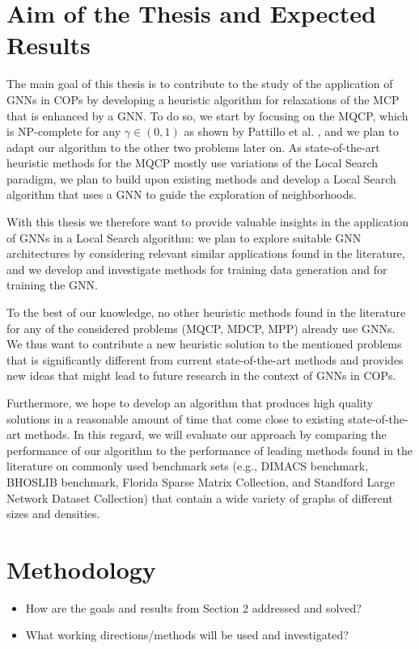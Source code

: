 \documentclass [11pt]{article}
\begin{document}
\section{Aim of the Thesis and Expected Results}
The main goal of this thesis is to contribute to the study of the application of GNNs in COPs by developing a heuristic algorithm for relaxations of the MCP that is enhanced by a GNN. To do so, we start by focusing on the MQCP, which is NP-complete for any $\gamma \in (0,1)$ as shown by Pattillo et al. \cite{pattillo_maximum_2013}, and we plan to adapt our algorithm to the other two problems later on. 
As state-of-the-art heuristic methods for the MQCP mostly use variations of the Local Search paradigm, we plan to build upon existing methods and develop a Local Search algorithm that uses a GNN to guide the exploration of neighborhoods. 

With this thesis we therefore want to provide valuable insights in the application of GNNs in a Local Search algorithm: we plan to explore suitable GNN architectures by considering relevant similar applications found in the literature, and we develop and investigate methods for training data generation and for training the GNN. 

To the best of our knowledge, no other heuristic methods found in the literature for any of the considered problems (MQCP, MDCP, MPP) already use GNNs. We thus want to contribute a new heuristic solution to the mentioned problems that is significantly different from current state-of-the-art methods and provides new ideas that might lead to future research in the context of GNNs in COPs. 

Furthermore, we hope to develop an algorithm that produces high quality solutions in a reasonable amount of time that come close to existing state-of-the-art methods. In this regard, we will evaluate our approach by comparing the performance of our algorithm to the performance of leading methods found in the literature on commonly used benchmark sets (e.g., DIMACS benchmark, BHOSLIB benchmark, Florida Sparse Matrix Collection, and Standford Large Network Dataset Collection) that contain a wide variety of graphs of different sizes and densities. 

\section{Methodology}
\begin{itemize}
	\item How are the goals and results from Section 2 addressed and solved?
	\item What working directions/methods will be used and investigated?
\end{itemize}
\end{document}
